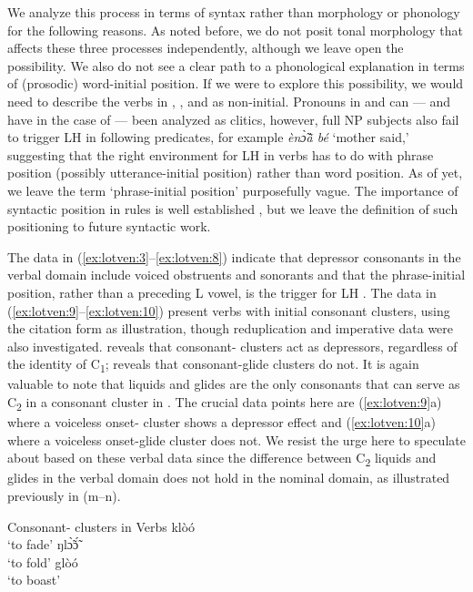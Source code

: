 \documentclass[output=paper,newtxmath,modfonts,nonflat,hidelinks]{langsci/langscibook}
\begin{document}
We analyze this process in terms of syntax rather than morphology or phonology for the following reasons. As noted before, we do not posit tonal morphology that affects these three processes independently, although we leave open the possibility. We also do not see a clear path to a phonological explanation in terms of (prosodic) word-initial position. If we were to explore this possibility, we would need to describe the verbs in , , and  as non-initial. Pronouns in  and  can — and have in the case of  \citep{Duthie1996} — been analyzed as clitics, however, full NP subjects also fail to trigger LH  in following predicates, for example
\textit{èn\`{\~{ɔ}}\`{ã}  bé} 
‘mother said,’ suggesting that the right environment for LH  in verbs has to do with phrase position (possibly utterance-initial position) rather than word position. As of yet, we leave the term ‘phrase-initial position’ purposefully vague. The importance of syntactic position in  rules is well established \citep{Snider2014}, but we leave the definition of such positioning to future syntactic work.

The data in (\ref{ex:lotven:3}–\ref{ex:lotven:8}) indicate that depressor consonants in the verbal domain include voiced obstruents and sonorants and that the phrase-initial position, rather than a preceding L  vowel, is the trigger for LH . The data in (\ref{ex:lotven:9}--\ref{ex:lotven:10}) present verbs with initial consonant clusters, using the citation form as illustration, though reduplication and imperative data were also investigated.  reveals that consonant- clusters act as depressors, regardless of the identity of C\textsubscript{1};  reveals that consonant-glide clusters do not. It is again valuable to note that liquids and glides are the only consonants that can serve as C\textsubscript{2} in a consonant cluster in . The crucial data points here are (\ref{ex:lotven:9}a) where a voiceless onset- cluster shows a depressor effect and (\ref{ex:lotven:10}a) where a voiceless onset-glide cluster does not. We resist the urge here to speculate about  based on these verbal data since the difference between C\textsubscript{2} liquids and glides in the verbal domain does not hold in the nominal domain, as illustrated previously in  (m–n).

\ea\label{ex:lotven:9}Consonant- clusters in  Verbs
\ea\label{ex:lotven:9a}
    klòó\\
    \glt ‘to fade’
\ex\label{ex:lotven:9b}
	ŋlɔ̃̀ɔ̃́\\
    \glt ‘to fold’
\ex\label{ex:lotven:9c}
	glòó\\
    \glt ‘to boast’
\z
\z
\end{document}
